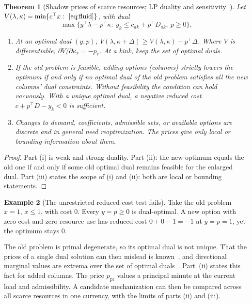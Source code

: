 \documentclass[11pt]{article}
\newtheorem{theorem}{Theorem}
\theoremstyle{definition}
\newtheorem{example}[theorem]{Example}
\theoremstyle{remark}
\newcommand{\pr}{\mathrm{pr}}
\begin{document}
\begin{theorem}[Shadow prices of scarce resources; LP duality and
sensitivity~\cite{boyd}]\label{thm:prices}
Let $V(\lambda,\kappa)=\min\{c^\top x:\ \eqref{eq:fluid}\}$, with dual
\[
\max\big\{y^\top\lambda-p^\top\kappa:\ y_k\le c_{ak}+p^\top D_{ak},\ p\ge0\big\}.
\]
\begin{enumerate}[label=(\roman*),itemsep=2pt]
\item At an optimal dual $(y,p)$, $V(\lambda,\kappa+\Delta)\ge V(\lambda,\kappa)-p^\top\Delta$. Where
$V$ is differentiable, $\partial V/\partial\kappa_r=-p_r$. At a kink, keep the set of optimal duals.
\item If the old problem is feasible, adding options (columns) strictly lowers the optimum if and only
if \emph{no} optimal dual of the old problem satisfies all the new columns' dual constraints. Without
feasibility the condition can hold vacuously. With a unique optimal dual, a negative reduced cost
$c+p^\top D-y_k<0$ is sufficient.
\item Changes to demand, coefficients, admissible sets, or available options are discrete and in
general need reoptimization. The prices give only local or bounding information about them.
\end{enumerate}
\end{theorem}
\begin{proof}
Part (i) is weak and strong duality. Part (ii): the new optimum equals the old one if and only if some
old optimal dual remains feasible for the enlarged dual. Part (iii) states the scope of (i) and (ii):
both are local or bounding statements.
\end{proof}
\begin{example}[The unrestricted reduced-cost test fails]\label{ex:degenerate}
Take the old problem $x=1$, $x\le1$, with cost $0$. Every $y=p\ge0$ is dual-optimal. A new option with
zero cost and zero resource use has reduced cost $0+0-1=-1$ at $y=p=1$, yet the optimum stays $0$.
\end{example}
The old problem is primal degenerate, so its optimal dual is not unique. That the prices of a single
dual solution can then mislead is known~\cite{aucamp82,akgul84,gal86,jansen97}, and directional
marginal values are extrema over the set of optimal duals~\cite{mills56,williams63}. Part~(ii) states
this fact for added columns.
The price $p_{\pr}$ values a principal minute at the current load and admissibility. A candidate
mechanization can then be compared across all scarce resources in one currency, with the limits of
parts (ii) and (iii).
\end{document}
